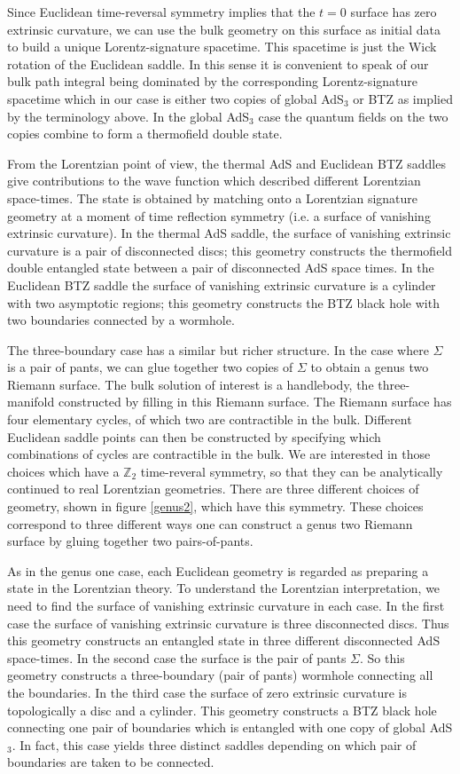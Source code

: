 \documentclass[12pt]{article}
\numberwithin{equation}{section}
\begin{document}
Since Euclidean time-reversal symmetry implies that the $t=0$ surface has zero extrinsic curvature, we can use the bulk geometry on this surface as initial data to build a unique Lorentz-signature spacetime.  This spacetime is just the Wick rotation of the Euclidean saddle.  In this sense it is convenient to speak of our bulk path integral being dominated by the corresponding Lorentz-signature spacetime which in our case is either two copies of global AdS$_{3}$ or BTZ as implied by the terminology above.  In the global AdS${}_3$ case the quantum fields on the two copies combine to form a thermofield double state.


From the Lorentzian point of view, the thermal AdS and Euclidean BTZ saddles give contributions to the wave function which described different Lorentzian space-times.  The state is obtained by matching onto a Lorentzian signature geometry at a moment of time reflection symmetry (i.e. a surface of vanishing extrinsic curvature).  In  the thermal AdS saddle, the surface of vanishing extrinsic curvature is a pair of disconnected discs; this geometry constructs the thermofield double entangled state between a pair of disconnected AdS space times.  In the Euclidean BTZ saddle the surface of vanishing extrinsic curvature is a cylinder with two asymptotic regions; this geometry constructs the BTZ black hole  with two boundaries connected by a wormhole.


The three-boundary case has a similar but richer structure. In the case where $\Sigma$ is a pair of pants, we can glue together two copies of $\Sigma$ to obtain a genus two Riemann surface.  The bulk solution of interest is a handlebody, the three-manifold constructed by filling in this Riemann surface. The Riemann surface has four elementary cycles, of which two are contractible in the bulk.
Different Euclidean saddle points can then be constructed by specifying which combinations of cycles are contractible in the bulk.
We are interested in those choices which have a $\mathbb Z_2$ time-reveral symmetry, so that they can be analytically continued to real Lorentzian geometries.
There are three different choices of geometry, shown in figure \ref{genus2}, which have this symmetry.  These choices correspond to three different ways one can construct a genus two Riemann surface by gluing together two pairs-of-pants.


As in the genus one case, each Euclidean geometry is regarded as preparing a state in the Lorentzian theory.
To understand the Lorentzian interpretation, we need to find the surface of vanishing extrinsic curvature in each case.
In the first case the surface of vanishing extrinsic curvature is three disconnected discs.
Thus this geometry constructs an entangled state in three different disconnected AdS space-times.
In the second case the surface is the pair of pants $\Sigma$.  So this geometry constructs a three-boundary (pair of pants) wormhole connecting all the boundaries.
In the third case the surface of zero extrinsic curvature is topologically a disc and a cylinder.  This geometry constructs
a BTZ black hole connecting one pair of boundaries which is entangled with one copy of global AdS$_3$.
In fact, this case yields three distinct saddles depending on which pair of boundaries are taken to be connected.
\end{document}
